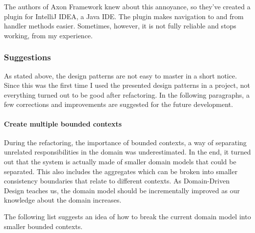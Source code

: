 \documentclass{book}
\begin{document}
The authors of Axon Framework knew about this annoyance, so they've
created a plugin \cite{idea-plugin} for IntelliJ IDEA, a Java IDE. The
plugin makes navigation to and from handler methods easier. Sometimes,
however, it is not fully reliable and stops working, from my experience.


\subsubsection{Suggestions}\label{suggestions}

As stated above, the design patterns are not easy to master in a short
notice. Since this was the first time I used the presented design
patterns in a project, not everything turned out to be good after
refactoring. In the following paragraphs, a few corrections and
improvements are suggested for the future development.

\paragraph{Create multiple bounded
contexts}\label{create-multiple-bounded-contexts}

During the refactoring, the importance of bounded contexts, a way of
separating unrelated responsibilities in the domain was underestimated.
In the end, it turned out that the system is actually made of smaller
domain models that could be separated. This also includes the aggregates
which can be broken into smaller consistency boundaries that relate to
different contexts. As Domain-Driven Design \cite{ddd} teaches us, the
domain model should be incrementally improved as our knowledge about the
domain increases.

The following list suggests an idea of how to break the current domain
model into smaller bounded contexts.
\end{document}
